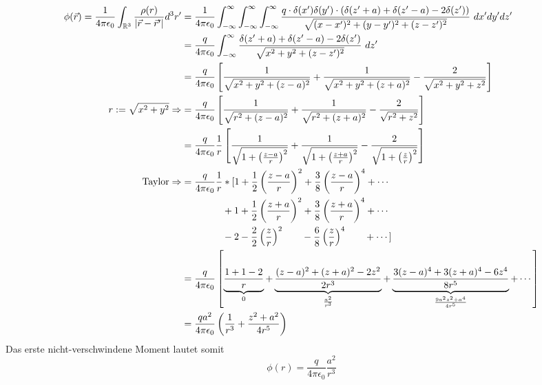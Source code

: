 \documentclass[11pt a4paper]{article}
\newcommand{\epsz}{\epsilon_0}
\begin{document}
\begin{align*}
	\phi(\vec r) = \frac1{4\pi\epsz} \int_{\mathbb{R}^3} 
	\frac{\rho(r)}{\vert \vec r - \vec r^\prime \vert} d^3r^\prime
	&= \frac{1}{4\pi\epsz} 
	\int_{-\infty}^\infty
	\int_{-\infty}^\infty
	\int_{-\infty}^\infty
	\frac{
	q \cdot \delta(x^\prime) \delta(y^\prime) \cdot \left(
	\delta(z^\prime+a) + \delta(z^\prime-a) - 2\delta(z^\prime) \right)}
	{\sqrt{(x-x^\prime)^2 +(y-y^\prime)^2 + (z-z^\prime)^2}}
	\ dx^\prime dy^\prime dz^\prime \\
	&= \frac{q}{4\pi\epsz} 
	\int_{-\infty}^\infty 
	\frac{\delta(z^\prime+a) + \delta(z^\prime-a) - 2\delta(z^\prime)}
	{\sqrt{x^2 + y^2 + (z - z^\prime)^2}}
	\ dz^\prime \\
	&= \frac{q}{4\pi\epsz} \left[
		\frac{1}{\sqrt{x^2 + y^2 + (z-a)^2}} + 
		\frac{1}{\sqrt{x^2 + y^2 + (z+a)^2}} -
		\frac{2}{\sqrt{x^2 + y^2 + z^2}}  
	\right] \\
	r := \sqrt{x^2 + y^2}
	\Rightarrow
	&= \frac{q}{4\pi\epsz} \left[
		\frac{1}{\sqrt{r^2 + (z-a)^2}} + 
		\frac{1}{\sqrt{r^2 + (z+a)^2}} -
		\frac{2}{\sqrt{r^2 + z^2}}  
	\right] \\
	&= \frac{q}{4\pi\epsz} \frac1r \left[
		\frac{1}{\sqrt{1 + \left( \frac{z-a}{r} \right)^2}} +
		\frac{1}{\sqrt{1 + \left( \frac{z+a}{r} \right)^2}} -
		\frac{2}{\sqrt{1 + \left( \frac{z}{r} \right)^2}} 
	\right] \\
	\text{Taylor} \Rightarrow
	&= \frac{q}{4\pi\epsz} \frac1r * [
			1 + \frac{1}{2} \left(\frac{z-a}{r}\right)^2
			+ \frac{3}{8} \left(\frac{z-a}{r}\right)^4
			+  \dotsb \\
			&\hspace{1.49cm} +
			1 + \frac{1}{2} \left(\frac{z+a}{r}\right)^2
			+ \frac{3}{8} \left(\frac{z+a}{r}\right)^4
			+  \dotsb \\
			&\hspace{1.49cm} -
			2 - \frac{2}{2} \left(\frac{z}{r}\right)^2
			\hspace{0.7cm}
			-\frac{6}{8} \left(\frac{z}{r}\right)^4
			\hspace{0.7cm} +  \dotsb] \\
	&= \frac{q}{4\pi\epsz} \left[
		\underbrace{\frac{1+1-2}{r}}_{0} +
		\underbrace{\frac{(z-a)^2 + (z+a)^2 - 2z^2}{2 r^3}}_{
			\frac{a^2}{r^3}}
		+ 
		\underbrace{\frac{3 (z-a)^4 + 3 (z+a)^4 - 6 z^4}{8 r^5}}_{
			\frac{9a^2 z^2 + a^4}{4r^5}} + \dotsb
		\right] \\
	&= \frac{q a^2}{4\pi\epsz} \left(
	\frac{1}{r^3} + \frac{z^2 + a^2}{4r^5} \right)
\end{align*}
Das erste nicht-verschwindene Moment lautet somit
\[
	\phi (r) = \frac{q}{4\pi\epsz} \frac{a^2}{r^3}
\]
\end{document}
